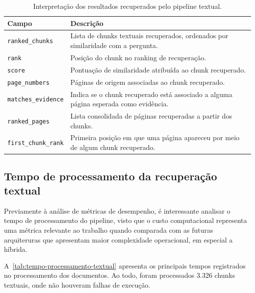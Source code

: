 \begin{table}[htbp]
\centering
\caption{Interpretação dos resultados recuperados pelo pipeline textual.}
\label{tab:rankings-pipeline-textual}
\small
\begin{tabular}{p{4.2cm}p{9.0cm}}
\toprule
\textbf{Campo} & \textbf{Descrição} \\
\midrule
\texttt{ranked\_chunks} & Lista de chunks textuais recuperados, ordenados por similaridade com a pergunta. \\
\addlinespace
\texttt{rank} & Posição do chunk no ranking de recuperação. \\
\addlinespace
\texttt{score} & Pontuação de similaridade atribuída ao chunk recuperado. \\
\addlinespace
\texttt{page\_numbers} & Páginas de origem associadas ao chunk recuperado. \\
\addlinespace
\texttt{matches\_evidence} & Indica se o chunk recuperado está associado a alguma página esperada como evidência. \\
\addlinespace
\texttt{ranked\_pages} & Lista consolidada de páginas recuperadas a partir dos chunks. \\
\addlinespace
\texttt{first\_chunk\_rank} & Primeira posição em que uma página apareceu por meio de algum chunk recuperado. \\
\bottomrule
\end{tabular}
\end{table}


\subsection{Tempo de processamento da recuperação textual}

Previamente à análise de métricas de desempenho, é interessante analisar o tempo de processamento do pipeline, visto que o custo computacional representa uma métrica relevante ao trabalho quando comparada com as futuras arquiteruras que apresentam maior complexidade operacional, em especial a híbrida.

A~\ref{tab:tempo-processamento-textual} apresenta os principais tempos registrados no processamento dos documentos. Ao todo, foram processados 3.326 chunks textuais, onde não houveram falhas de execução.


